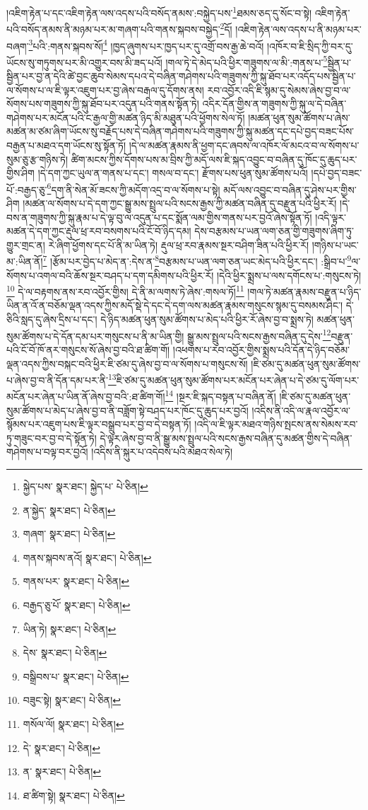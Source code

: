 །འཇིག་རྟེན་པ་དང་འཇིག་རྟེན་ལས་འདས་པའི་བསོད་ནམས་:བསྐྱེད་པས་\footnote{སྐྱེད་པས་  སྣར་ཐང་། སྐྱེད་པ་  པེ་ཅིན། }ཐམས་ཅད་དུ་སོང་བ་སྟེ། འཇིག་རྟེན་པའི་བསོད་ནམས་ནི་མཉམ་པར་མ་གཞག་པའི་གནས་སྐབས་བསྐྱེད་\footnote{ན་སྐྱེད་  སྣར་ཐང་།  པེ་ཅིན། }དོ། །འཇིག་རྟེན་ལས་འདས་པ་ནི་མཉམ་པར་བཞག་\footnote{གཞག་  སྣར་ཐང་།  པེ་ཅིན། }པའི་:གནས་སྐབས་སོ།\footnote{གནས་སྐབས་ནའོ།  སྣར་ཐང་།  པེ་ཅིན། } །ཁྱད་ཞུགས་པར་ཁྱད་པར་དུ་འགྲོ་བས་རྒྱ་ཆེ་བའོ། །འཁོར་བ་ཇི་སྲིད་ཀྱི་བར་དུ་ཡོངས་སུ་གཏུགས་པར་མི་འགྱུར་བས་མི་ཟད་པའོ། །གལ་ཏེ་དེ་མེད་པའི་ཕྱིར་གཟུགས་ལ་མི་:གནས་པ་\footnote{གནས་པར་  སྣར་ཐང་།  པེ་ཅིན། }སྦྱིན་པ་སྦྱིན་པར་བྱ་ན་དེའི་ཚེ་བྱང་ཆུབ་སེམས་དཔའ་དེ་བཞིན་གཤེགས་པའི་གཟུགས་ཀྱི་སྐུ་ཐོབ་པར་འདོད་པས་སྦྱིན་པ་ལ་སོགས་པ་ལ་ཇི་ལྟར་འཇུག་པར་བྱ་ཞེས་བརྒལ་དུ་དོགས་ནས། རབ་འབྱོར་འདི་ཇི་སྙམ་དུ་སེམས་ཞེས་བྱ་བ་ལ་སོགས་པས་གཟུགས་ཀྱི་སྐུ་ཐོབ་པར་འདུན་པའི་གནས་སྟོན་ཏེ། འདིར་དོན་གྱིས་ན་གཟུགས་ཀྱི་སྐུ་ལ་དེ་བཞིན་གཤེགས་པར་མངོན་པའི་ང་རྒྱལ་གྱི་མཚན་ཉིད་མི་མཐུན་པའི་ཕྱོགས་སེལ་ཏོ། །མཚན་ཕུན་སུམ་ཚོགས་པ་ཞེས་མཚན་མ་ཙམ་ཞིག་ཡོངས་སུ་བརྗོད་པས་དེ་བཞིན་གཤེགས་པའི་གཟུགས་ཀྱི་སྐུ་མཚན་དང་དཔེ་བྱད་བཟང་པོས་བརྒྱན་པ་མཐའ་དག་ཡོངས་སུ་སྟོན་ཏོ། །དེ་ལ་མཚན་རྣམས་ནི་ཕྱག་དང་ཞབས་ལ་འཁོར་ལོ་མངའ་བ་ལ་སོགས་པ་སུམ་ཅུ་རྩ་གཉིས་ཏེ། ཚིག་མངས་ཀྱིས་དོགས་པས་མ་བྲིས་ཀྱི་མདོ་ལས་ཇི་སྐད་འབྱུང་བ་བཞིན་དུ་ཁོང་དུ་ཆུད་པར་གྱིས་ཤིག །དེ་དག་ཀྱང་ཡུལ་ན་གནས་པ་དང་། གསལ་བ་དང་། རྫོགས་པས་ཕུན་སུམ་ཚོགས་པའོ། །དཔེ་བྱད་བཟང་པོ་:བརྒྱད་ཅུ་\footnote{བརྒྱད་ཅུ་པོ་  སྣར་ཐང་།  པེ་ཅིན། }དག་ནི་སེན་མོ་ཟངས་ཀྱི་མདོག་འདྲ་བ་ལ་སོགས་པ་སྟེ། མདོ་ལས་འབྱུང་བ་བཞིན་དུ་ཤེས་པར་གྱིས་ཤིག །མཚན་ལ་སོགས་པ་དེ་དག་ཀྱང་སྒྱུ་མས་སྤྲུལ་པའི་སངས་རྒྱས་ཀྱི་མཚན་བཞིན་དུ་བརྫུན་པའི་ཕྱིར་རོ། །དེ་བས་ན་གཟུགས་ཀྱི་སྐུ་རྣམ་པ་དེ་ལྟ་བུ་ལ་འདུན་པ་དང་སྨོན་ལམ་གྱིས་གནས་པར་བྱའོ་ཞེས་སྟོན་ཏོ། །འདི་ལྟར་མཚན་དེ་དག་ཀྱང་རྡུལ་ཕྲ་རབ་བསགས་པའི་ངོ་བོ་ཉིད་དམ། དེས་བརྩམས་པ་ཡན་ལག་ཅན་གྱི་གཟུགས་ཞིག་ཏུ་གྱུར་གྲང་ན། རེ་ཞིག་ཕྱོགས་དང་པོ་ནི་མ་ཡིན་ཏེ། རྡུལ་ཕྲ་རབ་རྣམས་སྔར་བཤིག་ཟིན་པའི་ཕྱིར་རོ། །གཉིས་པ་ཡང་མ་:ཡིན་ནོ།\footnote{ཡིན་ཏེ།  སྣར་ཐང་།  པེ་ཅིན། } །རྩོམ་པར་བྱེད་པ་མེད་ན་:དེས་ན་\footnote{དེས་  སྣར་ཐང་།  པེ་ཅིན། }བརྩམས་པ་ཡན་ལག་ཅན་ཡང་མེད་པའི་ཕྱིར་དང་། :སྒྲིབ་པ་\footnote{བསྒྲིབས་པ་  སྣར་ཐང་།  པེ་ཅིན། }ལ་སོགས་པ་འགལ་བའི་ཆོས་སྔར་བཤད་པ་དག་དམིགས་པའི་ཕྱིར་རོ། །དེའི་ཕྱིར་སྨྲས་པ་ལས་དགོངས་པ་:གསུངས་ཏེ།\footnote{བཟུང་སྟེ།  སྣར་ཐང་།  པེ་ཅིན། } དེ་ལ་བརྟགས་ནས་རབ་འབྱོར་གྱིས། དེ་ནི་མ་ལགས་ཏེ་ཞེས་:གསལ་ཏོ།\footnote{གསོལ་ལོ།  སྣར་ཐང་།  པེ་ཅིན། } །གལ་ཏེ་མཚན་རྣམས་བརྫུན་པ་ཉིད་ཡིན་ན་འོ་ན་བཅོམ་ལྡན་འདས་ཀྱིས་མདོ་སྡེ་དེ་དང་དེ་དག་ལས་མཚན་རྣམས་གསུངས་སྙམ་དུ་བསམས་ཤིང་། དེ་ཅིའི་སླད་དུ་ཞེས་དྲིས་པ་དང་། དེ་ཉིད་མཚན་ཕུན་སུམ་ཚོགས་པ་མེད་པའི་ཕྱིར་རོ་ཞེས་བྱ་བ་སྨྲས་ཏེ། མཚན་ཕུན་སུམ་ཚོགས་པ་དེ་དོན་དམ་པར་གསུངས་པ་ནི་མ་ཡིན་གྱི། སྒྱུ་མས་སྤྲུལ་པའི་སངས་རྒྱས་བཞིན་དུ་དེས་\footnote{དེ་  སྣར་ཐང་།  པེ་ཅིན། }བརྫུན་པའི་ངོ་བོ་ཁོ་ནར་གསུངས་སོ་ཞེས་བྱ་བའི་ཐ་ཚིག་གོ། །འཕགས་པ་རབ་འབྱོར་གྱིས་སྨྲས་པའི་དོན་དེ་ཉིད་བཅོམ་ལྡན་འདས་ཀྱིས་བསྐང་བའི་ཕྱིར་ཇི་ཙམ་དུ་ཞེས་བྱ་བ་ལ་སོགས་པ་གསུངས་སོ། །ཇི་ཙམ་དུ་མཚན་ཕུན་སུམ་ཚོགས་པ་ཞེས་བྱ་བ་ནི་དོན་དམ་པར་ནི་\footnote{ན་  སྣར་ཐང་།  པེ་ཅིན། }ཇི་ཙམ་དུ་མཚན་ཕུན་སུམ་ཚོགས་པར་མངོན་པར་ཞེན་པ་དེ་ཙམ་དུ་ལོག་པར་མངོན་པར་ཞེན་པ་ཡིན་ནོ་ཞེས་བྱ་བའི་:ཐ་ཚིག་གོ།\footnote{ཐ་ཚིག་སྟེ།  སྣར་ཐང་།  པེ་ཅིན། } །སྔར་ཇི་སྐད་བསྟན་པ་བཞིན་ནོ། །ཇི་ཙམ་དུ་མཚན་ཕུན་སུམ་ཚོགས་པ་མེད་པ་ཞེས་བྱ་བ་ནི་བཟློག་སྟེ་བཤད་པར་ཁོང་དུ་ཆུད་པར་བྱའོ། །འདིས་ནི་འདི་ལ་རྣལ་འབྱོར་ལ་སྙོམས་པར་འཇུག་པས་ཇི་ལྟར་བསྒྲུབ་པར་བྱ་བ་དེ་བསྟན་ཏོ། །འདི་ལ་ཇི་ལྟར་མཐའ་གཉིས་སྤངས་ནས་སེམས་རབ་ཏུ་གཟུང་བར་བྱ་བ་དེ་སྟོན་ཏེ། དེ་ལྟར་ཞེས་བྱ་བ་ནི་སྒྱུ་མས་སྤྲུལ་པའི་སངས་རྒྱས་བཞིན་དུ་མཚན་གྱིས་དེ་བཞིན་གཤེགས་པ་བལྟ་བར་བྱའོ། །འདིས་ནི་སྐུར་པ་འདེབས་པའི་མཐའ་སེལ་ཏེ། 